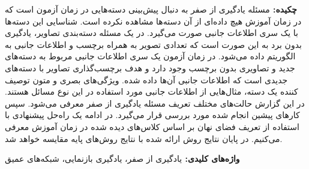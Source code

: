 {\bf {چکيده: }}
مسئله یادگیری از صفر
به دنبال پیش‌بینی دسته‌هایی در زمان آزمون است که در زمان آموزش هیچ داده‌ای از آن دسته‌ها مشاهده نکرده است. شناسایی این دسته‌ها با یک سری اطلاعات جانبی صورت می‌گیرد. در یک مسئله دسته‌بندی تصاویر، یادگیری بدون برد به این صورت است که تعدادی تصویر به همراه برچسب و اطلاعات جانبی به الگوریتم داده می‌شود. در زمان آزمون یک سری اطلاعات جانبی مربوط به دسته‌های جدید و تصاویری بدون برچسب وجود دارد و هدف برچسب‌گذاری تصاویر با دسته‌های جدیدی است که اطلاعات جانبی آن‌ها داده شده. ویژگی‌های بصری و متون توصیف کننده یک دسته، مثال‌هایی از اطلاعات جانبی مورد استفاده در این نوع مسائل هستند. 
در این گزارش حالت‌های مختلف تعریف مسئله یادگیری از صفر معرفی می‌شود. سپس کارهای پیشین انجام شده مورد بررسی قرار می‌گیرد. در ادامه یک راه‌حل پیشنهادی با استفاده از تعریف فضای نهان بر اساس کلاس‌های دیده شده در زمان آموزش معرفی می‌کنیم. در پایان نتایج روش ارائه شده با نتایج روش‌های پایه مقایسه خواهد شد.

{\bf  { واژه‌های کلیدی: }}
یادگیری از صفر، یادگیری بازنمایی، شبکه‌های عمیق

